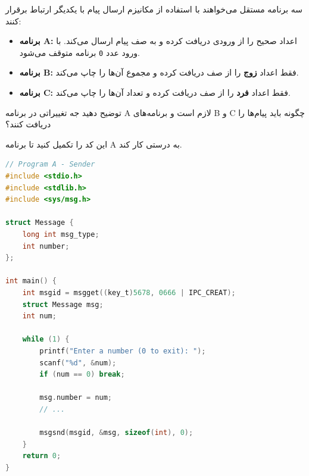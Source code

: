 \question[20] 
سه برنامه مستقل می‌خواهند با استفاده از مکانیزم ارسال پیام
با یکدیگر ارتباط برقرار کنند:

\begin{itemize}
    \item \textbf{برنامه A:}
          اعداد صحیح را از ورودی دریافت کرده و به صف پیام ارسال می‌کند.
          با ورود عدد \texttt{0} برنامه متوقف می‌شود.

    \item \textbf{برنامه B:}
          فقط اعداد \textbf{زوج} را از صف دریافت کرده و مجموع آن‌ها را چاپ می‌کند.

    \item \textbf{برنامه C:}
          فقط اعداد \textbf{فرد} را از صف دریافت کرده و تعداد آن‌ها را چاپ می‌کند.
\end{itemize}

توضیح دهید جه تغییراتی در برنامه A لازم است و برنامه‌های B و C چگونه باید پیام‌ها را دریافت کنند؟


این کد را تکمیل کنید تا برنامه A به درستی کار کند.
\begin{latin}
    \begin{lstlisting}[language=C]
// Program A - Sender
#include <stdio.h>
#include <stdlib.h>
#include <sys/msg.h>

struct Message {
    long int msg_type;
    int number;
};

int main() {
    int msgid = msgget((key_t)5678, 0666 | IPC_CREAT);
    struct Message msg;
    int num;
    
    while (1) {
        printf("Enter a number (0 to exit): ");
        scanf("%d", &num);
        if (num == 0) break;
        
        msg.number = num;
        // ...
        
        msgsnd(msgid, &msg, sizeof(int), 0);
    }
    return 0;
}
\end{lstlisting}
\end{latin}
